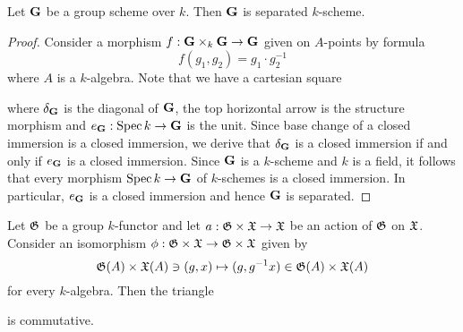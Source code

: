 \begin{proposition}\label{proposition:group_schemes_over_a_field_are_separated}
Let $\mathbf{G}$ be a group scheme over $k$. Then $\mathbf{G}$ is separated $k$-scheme.
\end{proposition}
\begin{proof}
Consider a morphism $f:\mathbf{G}\times_k\mathbf{G}\rightarrow \mathbf{G}$ given on $A$-points by formula
$$f(g_1,g_2) = g_1\cdot g_2^{-1}$$
where $A$ is a $k$-algebra. Note that we have a cartesian square
\begin{center}
\end{center}
where $\delta_{\mathbf{G}}$ is the diagonal of $\mathbf{G}$, the top horizontal arrow is the structure morphism and $e_{\mathbf{G}}:\mathrm{Spec}\, k\rightarrow \mathbf{G}$ is the unit. Since base change of a closed immersion is a closed immersion, we derive that $\delta_{\mathbf{G}}$ is a closed immersion if and only if $e_{\mathbf{G}}$ is a closed immersion. Since $\mathbf{G}$ is a $k$-scheme and $k$ is a field, it follows that every morphism $\mathrm{Spec}\, k\rightarrow \mathbf{G}$ of $k$-schemes is a closed immersion. In particular, $e_{\mathbf{G}}$ is a closed immersion and hence $\mathbf{G}$ is separated.
\end{proof}

\begin{remark}\label{remark:action_is_isomorphic_with_projection}
Let ${\mathfrak G}$ be a group $k$-functor and let $a:{\mathfrak G} \times {\mathfrak X} \rightarrow {\mathfrak X}$ be an action of ${\mathfrak G}$ on ${\mathfrak X}$. Consider an isomorphism $\phi:{\mathfrak G}\times {\mathfrak X}\rightarrow {\mathfrak G}\times {\mathfrak X}$ given by
$${\mathfrak G}(A)\times {\mathfrak X}(A)\ni (g,x)\mapsto (g,g^{-1}x)\in {\mathfrak G}(A)\times {\mathfrak X}(A)$$
for every $k$-algebra. Then the triangle
\begin{center}
\end{center}
is commutative.
\end{remark}

